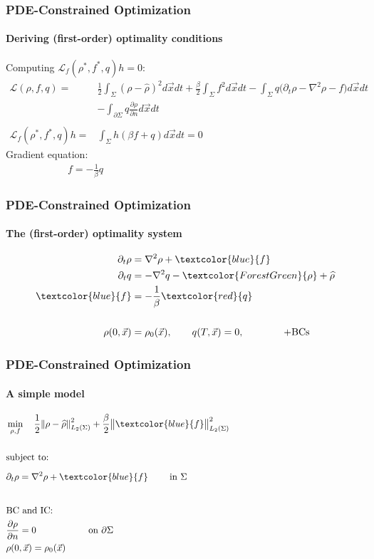 \documentclass[aspectratio=169,xcolor=dvipsnames]{beamer}
\begin{document}
\begin{frame}
	\frametitle{PDE-Constrained Optimization}
	\framesubtitle{Deriving (first-order) optimality conditions}
	Computing  $\mathcal{L}_f (\rho^*, f^*,q)h = 0$:
	\begin{align*}
		\mathcal{L}(\rho, f,q)=& \frac{1}{2}\int_\Sigma \left(\rho- \widehat{\rho}\right)^2 d \vec x dt + \frac{\beta}{2} \int_\Sigma f^2 d \vec x dt - \int_\Sigma q \bigg( \partial_t \rho - \nabla^2 \rho  - f \bigg) d\vec{x} dt \\
		&- \int_{\partial \Sigma} q \frac{\partial \rho}{\partial n}   d\vec{x} dt\\
		\\
		\mathcal{L}_f (\rho^*, f^*,q)h = & \int_\Sigma h \left(\beta f + q \right) d\vec{x} dt = 0
	\end{align*}
	Gradient equation:
	\begin{align*}
		f = -\frac{1}{\beta}q \qquad\qquad\qquad\qquad\qquad\qquad\qquad\qquad\qquad\qquad
	\end{align*}
\end{frame}
\begin{frame}
	\frametitle{PDE-Constrained Optimization}
	\framesubtitle{The (first-order) optimality system}
	
	\begin{align*}
		\partial_t \rho &= \nabla^2 \rho + \textcolor{blue}{f}  \\
		\partial_t q &=  -  \nabla^2 q - \textcolor{ForestGreen}{\rho} + \widehat \rho \\
		\textcolor{blue}{f} &= - \frac{1}{\beta}\textcolor{red}{q}\\
		\\
		\rho(0,\vec{x})&=\rho_0(\vec{x}), \qquad q(T,\vec{x})= 0, \qquad \qquad \text{+BCs}
	\end{align*}
\end{frame}
\begin{frame}
	\frametitle{PDE-Constrained Optimization}
	\framesubtitle{A simple model}
	\begin{align*}
		&\min_{\rho,f} \quad \frac{1}{2}\norm{\rho- \widehat{\rho}}_{L_2(\Sigma)}^2 + \frac{\beta}{2} \norm{\textcolor{blue}{f}}_{L_2(\Sigma)}^2\\
		\\
		&\text{subject to:}
		\\
		& \partial_t \rho = \nabla^2 \rho + \textcolor{blue}{f} \qquad \text{ in    } \Sigma   \phantom{ \nabla \cdot (\rho \vec{w})+{\nabla \cdot \int_\Omega \rho(\vec{x}) \rho(\vec{x}') \nabla V_2(|\vec{x}-\vec{x}\hspace{0.2em}'|)d\vec{x}'} }\\
		\\
		&\text{BC } \text{and IC:}\\
		&\frac{\partial \rho}{\partial n}  = 0 \quad \ \ \qquad \qquad \text{on   } \partial \Sigma   \\
		&\rho(0,\vec{x}) = \rho_0(\vec{x})
	\end{align*}
	
\end{frame}
\end{document}
